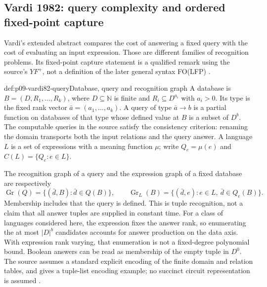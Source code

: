 
\subsection{Vardi 1982: query complexity and ordered fixed-point capture}
\label{sec:p09-n-c-004-02}

Vardi's extended abstract compares the cost of answering a fixed query with
the cost of evaluating an input expression.  Those are different families of
recognition problems.  Its fixed-point capture statement is a qualified
remark using the source's \(YF^+\), not a definition of the later general
syntax FO(LFP) \cite[pp.~137--143]{Vardi1982}.

\begin{hbdefinition}{def:p09-vardi82-query}{Database, query and recognition graph}
A database is \(B=(D,R_1,\ldots,R_k)\), where \(D\subseteq\mathbb N\)
is finite and \(R_i\subseteq D^{a_i}\) with \(a_i>0\).
Its type is the fixed rank vector \(\bar a=(a_1,\ldots,a_k)\).
A query of type \(\bar a\to b\) is a partial function on databases of
that type whose defined value at \(B\) is a subset of \(D^b\).
The computable queries in the source satisfy the consistency criterion:
renaming the domain transports both the input relations and the query answer.
A language \(L\) is a set of expressions with a meaning function
\(\mu\); write \(Q_e=\mu(e)\) and
\(C(L)=\{Q_e:e\in L\}\).

The recognition graph of a query and the expression graph of a fixed database
are respectively
\[
 \operatorname{Gr}(Q)=\{(\bar d,B):\bar d\in Q(B)\},\qquad
 \operatorname{Gr}_{L}(B)=
    \{(\bar d,e):e\in L,\ \bar d\in Q_e(B)\}.
\]
Membership includes that the query is defined.  This is tuple recognition,
not a claim that all answer tuples are supplied in constant time.
For a class of languages considered here, the expression fixes the answer
rank, so enumerating the at most \(\lvert D\rvert^b\) candidates accounts
for answer production on the data axis.  With expression rank varying,
that enumeration is not a fixed-degree polynomial bound.
Boolean answers can be read as membership of the
empty tuple in \(D^0\).  The source assumes a standard explicit encoding
of the finite domain and relation tables, and gives a tuple-list encoding
example; no succinct circuit representation is assumed
\cite[\S2, pp.~138--139]{Vardi1982}.
\end{hbdefinition}

